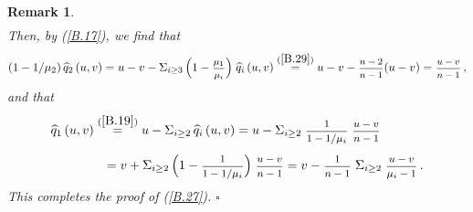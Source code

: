 \documentclass[12pt,leqno]{article}
\def\dis{\displaystyle}
\def\f{\footnotesize}
\def\wh{\widehat}
\newtheorem{remark}[theorem]{Remark}
\begin{document}
\begin{appendix}
\begin{remark}
\begin{equation}
\begin{split}
\end{split}
\end{equation}
Then, by (\ref{B.17}), we find that
\begin{equation}\label{B.30}
(1 - 1/\mu_2) \, \wh{q}_2\, (u,v) = u-v - \Sigma_{i \ge 3} \,\Big(1 - \mbox{\f $\dis\frac{\mu_1}{\mu_i}$}\Big) \;\wh{q}_i\, (u,v) \stackrel{{\rm (\ref{B.29})}}{=} u-v -  \mbox{\f $\dis\frac{n-2}{n-1}$} (u-v) = \mbox{\f $\dis\frac{u-v}{n-1}$}\,,
\end{equation}
and that
\begin{equation}\label{B.31}
\begin{split}
\wh{q}_1 \,(u,v) & \stackrel{{\rm (\ref{B.19})}}{=} u - \Sigma_{i \ge 2} \,\wh{q}_i \, (u,v) = u - \Sigma_{i \ge 2} \; \mbox{\f $\dis\frac{1}{1 - 1/\mu_i}$} \; \mbox{\f $\dis\frac{u-v}{n-1}$} 
\\[1ex]
&\;\;\,  = v + \Sigma_{i \ge 2} \, \Big(1 - \mbox{\f $\dis\frac{1}{1 - 1/\mu_i}$}\Big) \; \mbox{\f $\dis\frac{u-v}{n-1}$} = v - \mbox{\f $\dis\frac{1}{n-1}$} \; \Sigma_{i \ge 2} \; \mbox{\f $\dis\frac{u-v}{\mu_i -1}$} \,.
\end{split}
\end{equation}
This completes the proof of (\ref{B.27}). \hfill $\square$
\end{remark}
\end{appendix}
\end{document}
